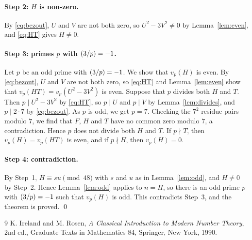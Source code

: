\documentclass[11pt]{article}
\newcommand{\leg}[2]{\mathchoice{\biggl(\dfrac{#1}{#2}\biggr)}{(#1/#2)}{(#1/#2)}{(#1/#2)}}
\begin{document}
\paragraph{Step 2: $H$ is non-zero.} By \eqref{eq:bezout}, $U$ and $V$ are not both zero, so $U^2-3V^2\neq0$ by Lemma~\ref{lem:even}, and \eqref{eq:HT} gives $H\neq0$.

\paragraph{\texorpdfstring{Step 3: primes $p$ with $\leg{3}{p}=-1$.}{Step 3: inert primes.}} Let $p$ be an odd prime with $\leg{3}{p}=-1$. We show that $v_p(H)$ is even. By \eqref{eq:bezout}, $U$ and $V$ are not both zero, so \eqref{eq:HT} and Lemma~\ref{lem:even} show that $v_p(HT)=v_p(U^2-3V^2)$ is even. Suppose that $p$ divides both $H$ and $T$. Then $p\mid U^2-3V^2$ by \eqref{eq:HT}, so $p\mid U$ and $p\mid V$ by Lemma~\ref{lem:divides}, and $p\mid 2\cdot 7$ by \eqref{eq:bezout}. As $p$ is odd, we get $p=7$. Checking the $7^2$ residue pairs modulo $7$, we find that $F$, $H$ and $T$ have no common zero modulo $7$, a contradiction. Hence $p$ does not divide both $H$ and $T$. If $p\nmid T$, then $v_p(H)=v_p(HT)$ is even, and if $p\nmid H$, then $v_p(H)=0$.

\paragraph{Step 4: contradiction.} By Step~1, $H\equiv su\pmod{48}$ with $s$ and $u$ as in Lemma~\ref{lem:odd}, and $H\neq0$ by Step~2. Hence Lemma~\ref{lem:odd} applies to $n=H$, so there is an odd prime $p$ with $\leg{3}{p}=-1$ such that $v_p(H)$ is odd. This contradicts Step~3, and the theorem is proved.
\qed

\begin{thebibliography}{9}
 K. Ireland and M. Rosen, \emph{A Classical Introduction to Modern Number Theory}, 2nd ed., Graduate Texts in Mathematics 84, Springer, New York, 1990.
\end{thebibliography}
\end{document}
